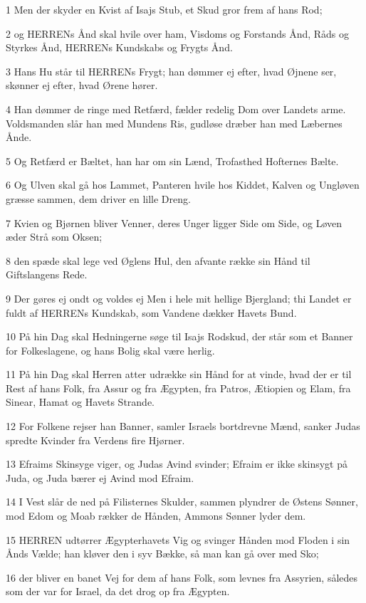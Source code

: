 \par 1 Men der skyder en Kvist af Isajs Stub, et Skud gror frem af hans Rod;
\par 2 og HERRENs Ånd skal hvile over ham, Visdoms og Forstands Ånd, Råds og Styrkes Ånd, HERRENs Kundskabs og Frygts Ånd.
\par 3 Hans Hu står til HERRENs Frygt; han dømmer ej efter, hvad Øjnene ser, skønner ej efter, hvad Ørene hører.
\par 4 Han dømmer de ringe med Retfærd, fælder redelig Dom over Landets arme. Voldsmanden slår han med Mundens Ris, gudløse dræber han med Læbernes Ånde.
\par 5 Og Retfærd er Bæltet, han har om sin Lænd, Trofasthed Hofternes Bælte.
\par 6 Og Ulven skal gå hos Lammet, Panteren hvile hos Kiddet, Kalven og Ungløven græsse sammen, dem driver en lille Dreng.
\par 7 Kvien og Bjørnen bliver Venner, deres Unger ligger Side om Side, og Løven æder Strå som Oksen;
\par 8 den spæde skal lege ved Øglens Hul, den afvante række sin Hånd til Giftslangens Rede.
\par 9 Der gøres ej ondt og voldes ej Men i hele mit hellige Bjergland; thi Landet er fuldt af HERRENs Kundskab, som Vandene dækker Havets Bund.
\par 10 På hin Dag skal Hedningerne søge til Isajs Rodskud, der står som et Banner for Folkeslagene, og hans Bolig skal være herlig.
\par 11 På hin Dag skal Herren atter udrække sin Hånd for at vinde, hvad der er til Rest af hans Folk, fra Assur og fra Ægypten, fra Patros, Ætiopien og Elam, fra Sinear, Hamat og Havets Strande.
\par 12 For Folkene rejser han Banner, samler Israels bortdrevne Mænd, sanker Judas spredte Kvinder fra Verdens fire Hjørner.
\par 13 Efraims Skinsyge viger, og Judas Avind svinder; Efraim er ikke skinsygt på Juda, og Juda bærer ej Avind mod Efraim.
\par 14 I Vest slår de ned på Filisternes Skulder, sammen plyndrer de Østens Sønner, mod Edom og Moab rækker de Hånden, Ammons Sønner lyder dem.
\par 15 HERREN udtørrer Ægypterhavets Vig og svinger Hånden mod Floden i sin Ånds Vælde; han kløver den i syv Bække, så man kan gå over med Sko;
\par 16 der bliver en banet Vej for dem af hans Folk, som levnes fra Assyrien, således som der var for Israel, da det drog op fra Ægypten.

